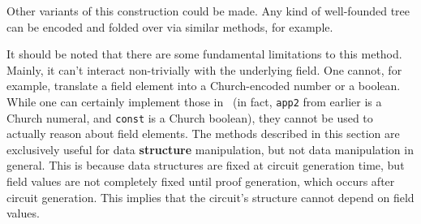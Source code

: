 Other variants of this construction could be made. Any kind of well-founded tree can be encoded and folded over via similar methods, for example.

It should be noted that there are some fundamental limitations to this method. Mainly, it can't interact non-trivially with the underlying field. One cannot, for example, translate a field element into a Church-encoded number or a boolean. While one can certainly implement those in \vampir\ (in fact, \lstinline|app2| from earlier is a Church numeral, and \lstinline|const| is a Church boolean), they cannot be used to actually reason about field elements. The methods described in this section are exclusively useful for data \textbf{structure} manipulation, but not data manipulation in general. This is because data structures are fixed at circuit generation time, but field values are not completely fixed until proof generation, which occurs after circuit generation. This implies that the circuit's structure cannot depend on field values.